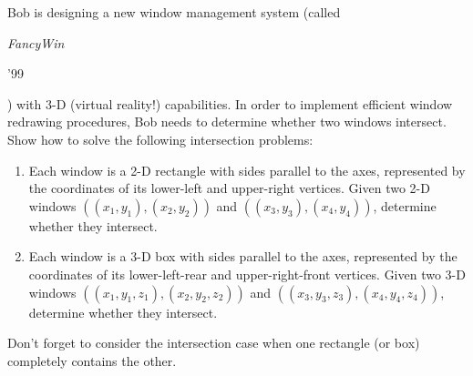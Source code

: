 Bob is designing a new window management system (called {\em FancyWin

'99}) with 3-D (virtual reality!) capabilities.  In order to implement
efficient window redrawing procedures, Bob needs to determine whether
two windows intersect.  Show how to solve the following intersection
problems:

\begin{enumerate}

\item  Each window is a 2-D rectangle with sides parallel to the axes,
represented by the coordinates of its lower-left and upper-right
vertices.  Given two 2-D windows $((x_1, y_1), (x_2, y_2))$ and $((x_3,
y_3), (x_4, y_4))$, determine whether they intersect.

\item  Each window is a 3-D box with sides parallel to the axes,
represented by the coordinates of its lower-left-rear and
upper-right-front vertices.  Given two 3-D windows $((x_1, y_1, z_1),
(x_2, y_2, z_2))$ and $((x_3, y_3, z_3), (x_4, y_4, z_4))$, determine
whether they intersect.

\end{enumerate}

\noindent  Don't forget to consider the intersection case when one
rectangle (or box) completely contains the other.
